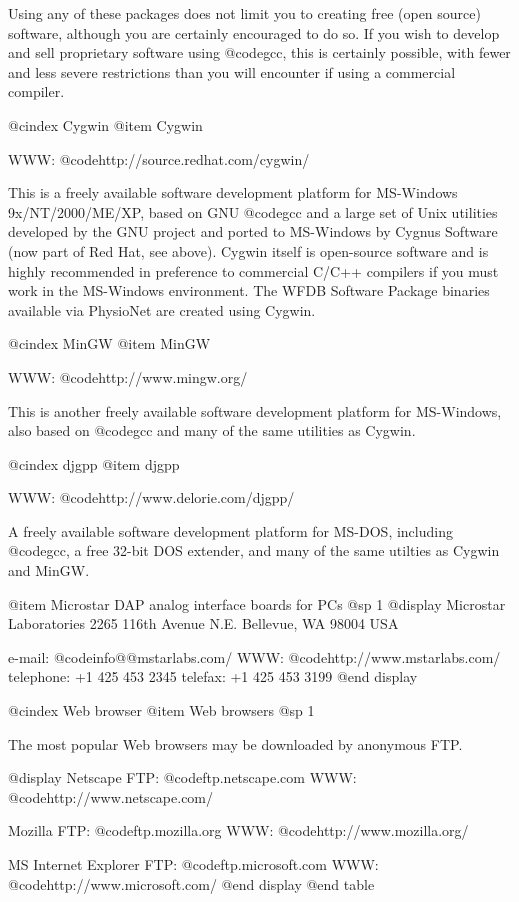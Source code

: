 {{{{{{{{{Using any of these packages does not limit you to creating free (open
source) software, although you are certainly encouraged to do so.  If you
wish to develop and sell proprietary software using @code{gcc}, this is
certainly possible, with fewer and less severe restrictions than you
will encounter if using a commercial compiler.

@cindex Cygwin
@item Cygwin

WWW: @code{http://source.redhat.com/cygwin/}

This is a freely available software development platform for MS-Windows
9x/NT/2000/ME/XP, based on GNU @code{gcc} and a large set of Unix
utilities developed by the GNU project and ported to MS-Windows by
Cygnus Software (now part of Red Hat, see above).  Cygwin itself is
open-source software and is highly recommended in preference to
commercial C/C++ compilers if you must work in the MS-Windows
environment.  The WFDB Software Package binaries available via PhysioNet
are created using Cygwin.

@cindex MinGW
@item MinGW

WWW: @code{http://www.mingw.org/}

This is another freely available software development platform for
MS-Windows, also based on @code{gcc} and many of the same utilities as
Cygwin.

@cindex djgpp
@item djgpp

WWW: @code{http://www.delorie.com/djgpp/}

A freely available software development platform for MS-DOS, including
@code{gcc}, a free 32-bit DOS extender, and many of the same utilties
as Cygwin and MinGW.

@item Microstar DAP analog interface boards for PCs
@sp 1
@display
Microstar Laboratories
2265 116th Avenue N.E.
Bellevue, WA 98004 USA

e-mail: @code{info@@mstarlabs.com/}
WWW: @code{http://www.mstarlabs.com/}
telephone: +1 425 453 2345
telefax: +1 425 453 3199
@end display

@cindex Web browser
@item Web browsers
@sp 1

The most popular Web browsers may be downloaded by anonymous FTP.

@display
Netscape
FTP: @code{ftp.netscape.com}
WWW: @code{http://www.netscape.com/}

Mozilla
FTP: @code{ftp.mozilla.org}
WWW: @code{http://www.mozilla.org/}

MS Internet Explorer
FTP: @code{ftp.microsoft.com}
WWW: @code{http://www.microsoft.com/}
@end display
@end table

}}}}}}}}}
